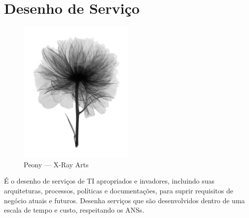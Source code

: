 %
%
%
%


\chapter{Desenho de Serviço}
\label{cha:design}


\begin{figure}
    \centering
    \includegraphics[width=0.5\textwidth]{img/peony}\\
    {\scriptsize Peony --- X-Ray Arts}
\end{figure}

É o desenho de serviços de TI apropriados e invadores, incluindo suas
arquiteturas, processos, políticas e documentações, para suprir requisitos de
negócio atuais e futuros. Desenha serviços que são desenvolvidos dentro de uma
escala de tempo e custo, respeitando os ANSs.


